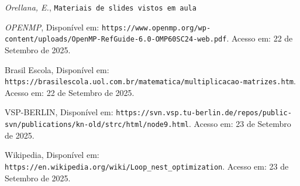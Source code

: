 \documentclass[12pt, a4paper]{article}
\begin{document}
	\begin{thebibliography}{9}
		 \textit{Orellana, E.}, \texttt{Materiais de slides vistos em aula}

		 \textit{OPENMP}, Disponível em: \texttt{https://www.openmp.org/wp-content/uploads/OpenMP-RefGuide-6.0-OMP60SC24-web.pdf}. Acesso em: 22 de Setembro de 2025.

		 Brasil Escola, Disponível em: \texttt{https://brasilescola.uol.com.br/matematica/multiplicacao-matrizes.htm}. Acesso em: 22 de Setembro de 2025.

		 VSP-BERLIN, Disponível em: \texttt{https://svn.vsp.tu-berlin.de/repos/public-svn/publications/kn-old/strc/html/node9.html}. Acesso em: 23 de Setembro de 2025.

		 Wikipedia, Disponível em: \texttt{https://en.wikipedia.org/wiki/Loop\_nest\_optimization}. Acesso em: 23 de Setembro de 2025.
	\end{thebibliography}
\end{document}
